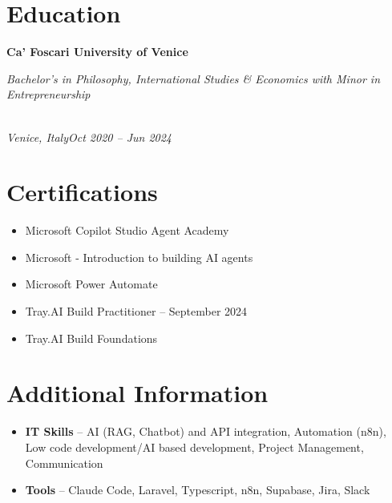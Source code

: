 \documentclass[a4paper,10pt]{article}
\newcommand{\role}[4]{\vspace{3pt}\noindent\hspace{0.6em}\parbox[t]{0.38\textwidth}{\raggedright\textbf{#1}}\hfill\parbox[t]{0.58\textwidth}{\raggedleft\textit{#2}}\\{\textit{#3}\hfill\textit{#4}}\vspace{1pt}}
\begin{document}
\section{Education}
\role{Ca' Foscari University of Venice}{Bachelor's in Philosophy, International Studies \& Economics with Minor in Entrepreneurship}{Venice, Italy}{Oct 2020 -- Jun 2024}

\section{Certifications}
\begin{itemize}
\item Microsoft Copilot Studio Agent Academy
\item Microsoft - Introduction to building AI agents
\item Microsoft Power Automate
\item Tray.AI Build Practitioner -- September 2024
\item Tray.AI Build Foundations
\end{itemize}

\section{Additional Information}
\begin{itemize}
\item \textbf{IT Skills} -- AI (RAG, Chatbot) and API integration, Automation (n8n), Low code development/AI based development, Project Management, Communication
\item \textbf{Tools} -- Claude Code, Laravel, Typescript, n8n, Supabase, Jira, Slack
\end{itemize}
\end{document}
